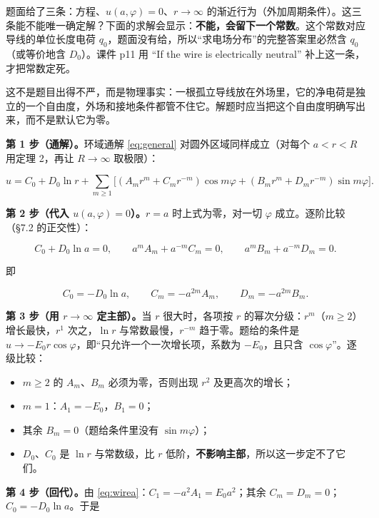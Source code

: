 \documentclass[11pt]{ctexart}
\let\origsubhdr\subhdr
\renewcommand{\subhdr}[1]{\par\needspace{3\baselineskip}\origsubhdr{#1}}
\begin{document}

题面给了三条：方程、$u(a,\varphi)=0$、$r\to\infty$ 的渐近行为（外加周期条件）。这三条能不能唯一确定解？下面的求解会显示：\textbf{不能，会留下一个常数}。这个常数对应导线的单位长度电荷 $q_0$，题面没有给，所以“求电场分布”的完整答案里必然含 $q_0$（或等价地含 $D_0$）。课件 p11 用 “If the wire is electrically neutral” 补上这一条，才把常数定死。

这不是题目出得不严，而是物理事实：一根孤立导线放在外场里，它的净电荷是独立的一个自由度，外场和接地条件都管不住它。解题时应当把这个自由度明确写出来，而不是默认它为零。


\textbf{第 1 步（通解）。}环域通解 \eqref{eq:general} 对圆外区域同样成立（对每个 $a<r<R$ 用定理 2，再让 $R\to\infty$ 取极限）：

\[
u=C_0+D_0\ln r+\sum_{m\ge1}\big[(A_mr^m+C_mr^{-m})\cos m\varphi+(B_mr^m+D_mr^{-m})\sin m\varphi\big].
\]

\textbf{第 2 步（代入 $u(a,\varphi)=0$）。}$r=a$ 时上式为零，对一切 $\varphi$ 成立。逐阶比较（\S7.2 的正交性）：

\[
C_0+D_0\ln a=0,\qquad
a^mA_m+a^{-m}C_m=0,\qquad
a^mB_m+a^{-m}D_m=0 .
\]

即

\begin{equation}
C_0=-D_0\ln a,\qquad C_m=-a^{2m}A_m,\qquad D_m=-a^{2m}B_m .
\label{eq:wirea}
\end{equation}

\textbf{第 3 步（用 $r\to\infty$ 定主部）。}当 $r$ 很大时，各项按 $r$ 的幂次分级：$r^m$（$m\ge2$）增长最快，$r^1$ 次之，$\ln r$ 与常数最慢，$r^{-m}$ 趋于零。题给的条件是 $u\to-E_0r\cos\varphi$，即“只允许一个一次增长项，系数为 $-E_0$，且只含 $\cos\varphi$”。逐级比较：

\begin{itemize}
  \item $m\ge2$ 的 $A_m$、$B_m$ 必须为零，否则出现 $r^2$ 及更高次的增长；
  \item $m=1$：$A_1=-E_0$，$B_1=0$；
  \item 其余 $B_m=0$（题给条件里没有 $\sin m\varphi$）；
  \item $D_0$、$C_0$ 是 $\ln r$ 与常数级，比 $r$ 低阶，\textbf{不影响主部}，所以这一步定不了它们。
\end{itemize}

\textbf{第 4 步（回代）。}由 \eqref{eq:wirea}：$C_1=-a^2A_1=E_0a^2$；其余 $C_m=D_m=0$；$C_0=-D_0\ln a$。于是
\end{document}
